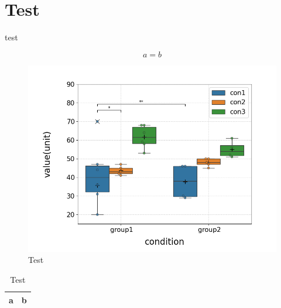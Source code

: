 \section[Test]{Test}
test\cite{example}

\begin{equation}
    \label{eq:test}
    a = b
\end{equation}

\begin{figure}[H]
    \centering
    \includegraphics[width=\textwidth]{figures/test/test.png} %
    \caption{Test}
    \label{fig:test}
\end{figure}

\begin{table}[H]
    \centering
    \caption{Test}
    \label{tab:test}
    \begin{tabular}{|c|c|}
        \hline
        a & b \\
        \hline
    \end{tabular}
\end{table}
